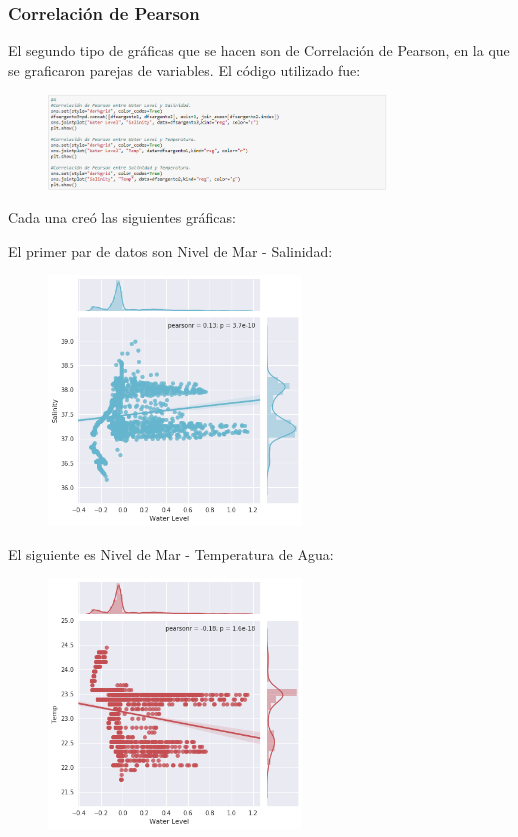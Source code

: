 \documentclass[a4paper]{article}
\begin{document}
\pagebreak
\subsubsection{Correlación de Pearson}
El segundo tipo de gráficas que se hacen son de Correlación de Pearson, en la que se graficaron parejas de variables. El código utilizado fue:
\begin{figure}[ht!]
 \centering
  \includegraphics[width=0.8\textwidth]{PearsonCodigo.PNG}
\end{figure}
Cada una creó las siguientes gráficas:

El primer par de datos son Nivel de Mar - Salinidad:
\begin{figure}[ht!]
 \centering
  \includegraphics[width=0.6\textwidth]{Pearson1.png}
\end{figure}

El siguiente es Nivel de Mar - Temperatura de Agua:
\begin{figure}[ht!]
 \centering
  \includegraphics[width=0.6\textwidth]{Pearson2.png}
\end{figure}
\end{document}
